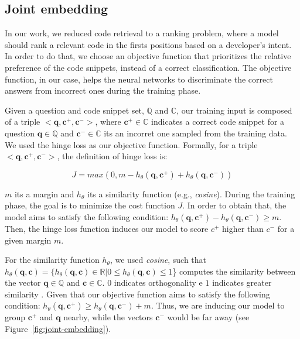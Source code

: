 \documentclass[sigconf]{acmart}
\begin{document}
\subsection{Joint embedding}
\label{sec:joint-embedding}

In our work, we reduced code retrieval to a ranking problem, where a model should rank a relevant code in the firsts positions based on a developer's intent. In order to do that, we choose an objective function that prioritizes the relative preference of the code snippets, instead of a correct classification. The objective function, in our case, helps the neural networks to discriminate the correct answers from incorrect ones during the training phase.


Given a question and code snippet set, $\mathbb{Q}$ and $\mathbb{C}$, our training input is composed of a triple $<\bm{q}, \bm{c^{+}}, \bm{c^{-}}>$, where $\bm{c^{+}} \in \mathbb{C}$ indicates a correct code snippet for a question $\bm{q} \in \mathbb{Q}$ and $\bm{c^{-}} \in \mathbb{C}$ its an incorret one sampled from the training data. We used the hinge loss as our objective function. Formally, for a triple $<\bm{q}, \bm{c^{+}}, \bm{c^{-}}>$, the definition of hinge loss is:

\begin{equation}
J = max(0, m - h_{\theta}(\bm{q}, \bm{c^{+}}) + h_{\theta}(\bm{q}, \bm{c^{-}}))
\end{equation}

$m$ its a margin and $h_{\theta}$ its a similarity function (e.g., \textit{cosine}). During the training phase, the goal is to minimize the cost function $J$. In order to obtain that, the model aims to satisfy the following condition: $h_{\theta}(\bm{q}, \bm{c^{+}}) - h_{\theta}(\bm{q}, \bm{c^{-}}) \geq m$. Then, the hinge loss function induces our model to score $c^{+}$ higher than $c^{-}$ for a given margin $m$. 

For the similarity function $h_{\theta}$, we used \emph{cosine}, such that $h_{\theta}(\bm{q}, \bm{c}) = \{h_{\theta}(\bm{q}, \bm{c}) \in \mathbb{R} | 0 \leq h_{\theta}(\bm{q}, \bm{c}) \leq 1$\} computes the similarity between the vector $\bm{q} \in \mathbb{Q}$ and $\bm{c} \in \mathbb{C}$. $0$ indicates orthogonality e $1$ indicates greater similarity \cite{keras-cosine-similarity-2019}.  Given that our objective function aims to satisfy the following condition: $h_{\theta}(\bm{q}, \bm{c^{+}}) \geq h_{\theta}(\bm{q}, \bm{c^{-}}) + m$. Thus, we are inducing our model to group $\bm{c^{+}}$ and $\bm{q}$ nearby, while the vectors $\bm{c^{-}}$ would be far away (see Figure~\ref{fig:joint-embedding}). 
\end{document}
